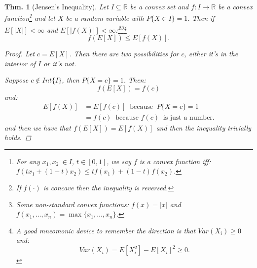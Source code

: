 \documentclass{tufte-book}
\theoremstyle{mytheoremstyle}
\newtheorem*{thm}{Thm.}
\theoremstyle{mylemstyle}
\theoremstyle{mydefstyle}
\begin{document}
\begin{thm}[Jensen's Inequality] Let \(I \subseteq \mathbb{R}\) be a convex set and \(f: I \rightarrow \mathbb{R}\) be a convex function\footnote{For any \(x_1, x_2\ \in I\), \(t \in [0, 1]\), we say \(f\) is a convex function iff: \(f(tx_1 + (1-t)x_2) \le tf(x_1) + (1-t)f(x_2)\).} and let \(X\) be a random variable with \(P\{X \in I\} = 1\). Then if \(E[|X|] < \infty\) and \(E[|f(X)|] < \infty\):\footnote{If \(f(\cdot)\) is concave then the inequality is reversed.}\footnote{Some non-standard convex functions: \(f(x) = |x|\) and \(f(x_1, \dots, x_n) = \max\{x_1, \dots, x_n\}\).}\footnote{A good mneomonic device to remember the direction is that \(Var(X_i) \ge 0\) and: \[Var(X_i) = E[X_i^2] - E[X_i]^2 \ge 0 \text{.}\]}
	\[f(E[X]) \le E[f(X)] \text{.}\]
	\begin{proof}
		Let \(c = E[X]\). Then there are two possibilities for \(c\), either it's in the interior of \(I\) or it's not. 
		
		Suppose \(c \not \in Int\{I\}\), then \(P\{X = c\} = 1\). Then:
			\[f(E[X]) = f(c)\]
		and:
			\begin{align*}
				E[f(X)] & = E[f(c)]\ \text{ because }\ P\{X = c\} = 1 \\
					& = f(c)\ \text{ because } f(c)\ \text{ is just a number.}
			\end{align*}
		and then we have that \(f(E[X]) = E[f(X)]\) and then the inequality trivially holds. 
		

\end{proof}
\end{thm}
\end{document}
